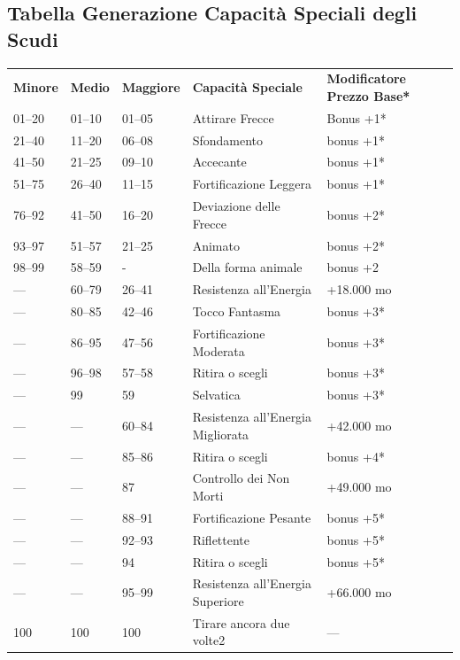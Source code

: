 \documentclass[a4paper,11pt,twoside,openany]{book}
\begin{document}
\subsection{Tabella Generazione Capacità Speciali degli Scudi}

\label{tabella-generazione-capacita-speciali-degli-scudi}


\begin{tabularx}{\textwidth}{lllXX}
	\toprule
	\textbf{Minore} & \textbf{Medio} & \textbf{Maggiore} & \textbf{Capacità Speciale}        & \textbf{Modificatore Prezzo Base{*}}\tabularnewline
	01--20          & 01--10         & 01--05            & Attirare Frecce                   & Bonus +1{*}\tabularnewline
	21--40          & 11--20         & 06--08            & Sfondamento                       & bonus +1{*}\tabularnewline
	41--50          & 21--25         & 09--10            & Accecante                         & bonus +1{*}\tabularnewline
	51--75          & 26--40         & 11--15            & Fortificazione Leggera            & bonus +1{*}\tabularnewline
	76--92          & 41--50         & 16--20            & Deviazione delle Frecce           & bonus +2{*}\tabularnewline
	93--97          & 51--57         & 21--25            & Animato                           & bonus +2{*}\tabularnewline
	98--99          & 58--59         & -                 & Della forma animale               & bonus +2\tabularnewline
	---             & 60--79         & 26--41            & Resistenza all'Energia            & +18.000 mo\tabularnewline
	---             & 80--85         & 42--46            & Tocco Fantasma                    & bonus +3{*}\tabularnewline
	---             & 86--95         & 47--56            & Fortificazione Moderata           & bonus +3{*}\tabularnewline
	---             & 96--98         & 57--58            & Ritira o scegli                   & bonus +3{*}\tabularnewline
	---             & 99             & 59                & Selvatica                         & bonus +3{*}\tabularnewline
	---             & ---            & 60--84            & Resistenza all'Energia Migliorata & +42.000 mo\tabularnewline
	---             & ---            & 85--86            & Ritira o scegli                   & bonus +4{*}\tabularnewline
	---             & ---            & 87                & Controllo dei Non Morti           & +49.000 mo\tabularnewline
	---             & ---            & 88--91            & Fortificazione Pesante            & bonus +5{*}\tabularnewline
	---             & ---            & 92--93            & Riflettente                       & bonus +5{*}\tabularnewline
	---             & ---            & 94                & Ritira o scegli                   & bonus +5{*}\tabularnewline
	---             & ---            & 95--99            & Resistenza all'Energia Superiore  & +66.000 mo\tabularnewline
	100             & 100            & 100               & Tirare ancora due volte2          & ---\tabularnewline
\end{tabularx}
\end{document}
